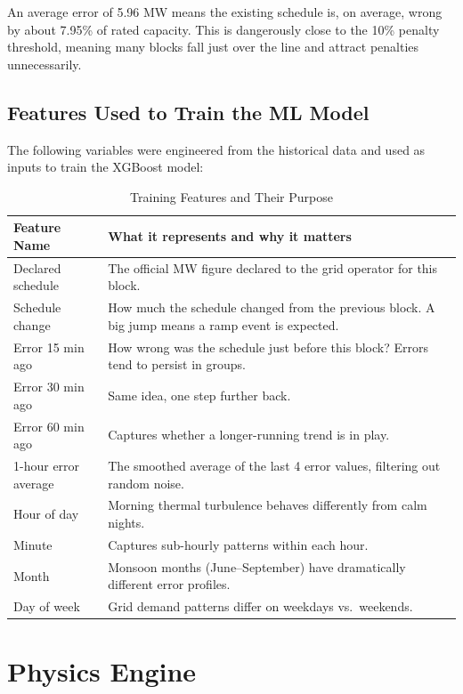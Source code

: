 \documentclass[12pt,a4paper]{report}
\begin{document}
An average error of 5.96 MW means the existing schedule is, on average, wrong by about 7.95\% of rated capacity. This is dangerously close to the 10\% penalty threshold, meaning many blocks fall just over the line and attract penalties unnecessarily.

\section{Features Used to Train the ML Model}

The following variables were engineered from the historical data and used as inputs to train the XGBoost model:

\begin{table}[H]
    \centering
    \caption{Training Features and Their Purpose}
    \begin{tabular}{p{3.5cm}p{9.5cm}}
        \toprule
        \textbf{Feature Name} & \textbf{What it represents and why it matters} \\
        \midrule
        Declared schedule & The official MW figure declared to the grid operator for this block. \\
        Schedule change & How much the schedule changed from the previous block. A big jump means a ramp event is expected. \\
        Error 15 min ago & How wrong was the schedule just before this block? Errors tend to persist in groups. \\
        Error 30 min ago & Same idea, one step further back. \\
        Error 60 min ago & Captures whether a longer-running trend is in play. \\
        1-hour error average & The smoothed average of the last 4 error values, filtering out random noise. \\
        Hour of day & Morning thermal turbulence behaves differently from calm nights. \\
        Minute & Captures sub-hourly patterns within each hour. \\
        Month & Monsoon months (June--September) have dramatically different error profiles. \\
        Day of week & Grid demand patterns differ on weekdays vs.\ weekends. \\
        \bottomrule
    \end{tabular}
\end{table}

\chapter{Physics Engine}
\end{document}
